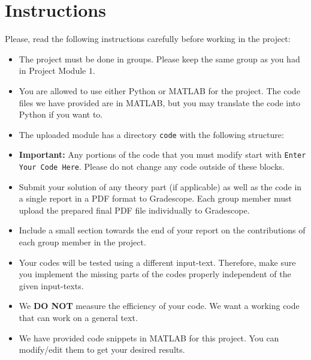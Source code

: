 \documentclass[a4paper,11pt]{article}
\begin{document}

\section*{Instructions}
Please, read the following instructions carefully before working in the project:
\begin{itemize}
\item The project must be done in groups. Please keep the same group as you had in Project Module $1$. 
\item You are allowed to use either Python or MATLAB for the project. The code files we have provided are in MATLAB, but you may translate the code into Python if you want to.
\item The uploaded module has a directory \texttt{code} with the following structure:
\item \textbf{Important:} Any portions of the code that you must modify start with \texttt{Enter Your Code Here}. Please do not change any code outside of these blocks.
\item Submit your solution of any theory part (if applicable) as well as the code in a single report in a PDF
format to Gradescope. 
Each group member must upload the prepared final PDF file individually to Gradescope. 
\item Include a small section towards the end of your report on the contributions of each group member in the project.
\item Your codes will be tested using a different input-text. Therefore, make sure you implement
the missing parts of the codes properly independent of the given input-texts.
\item We \textbf{DO NOT} measure the efficiency of your code. We want a working code that can work on a general text.
\item We have provided code snippets in MATLAB for this project. You can modify/edit them to get your desired results.
\end{itemize}
\end{document}

